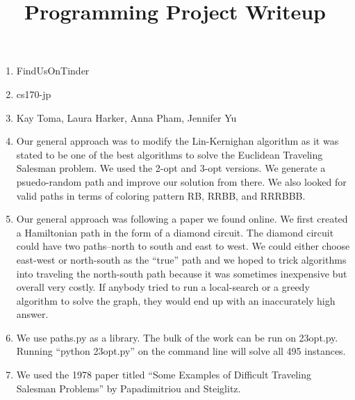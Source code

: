 \documentclass{article}
\begin{document}
\title{Programming Project Writeup}

\maketitle

\begin{enumerate}
\item FindUsOnTinder
\item cs170-jp
\item Kay Toma, Laura Harker, Anna Pham, Jennifer Yu
\item Our general approach was to modify the Lin-Kernighan algorithm as it was stated to be one of the best algorithms to solve the Euclidean Traveling Salesman problem. We used the 2-opt and 3-opt versions. We generate a psuedo-random path and improve our solution from there. We also looked for valid paths in terms of coloring pattern RB, RRBB, and RRRBBB. 
\item Our general approach was following a paper we found online. We first created a Hamiltonian path in the form of a diamond circuit. The diamond circuit could have two paths--north to south and east to west. We could either choose east-west or north-south as the ``true'' path and we hoped to trick algorithms into traveling the north-south path because it was sometimes inexpensive but overall very costly. If anybody tried to run a local-search or a greedy algorithm to solve the graph, they would end up with an inaccurately high answer. 
\item We use paths.py as a library. The bulk of the work can be run on 23opt.py. Running ``python 23opt.py'' on the command line will solve all 495 instances. 
\item We used the 1978 paper titled ``Some Examples of Difficult Traveling Salesman Problems'' by Papadimitriou and Steiglitz. 
\end{enumerate}
\end{document}
